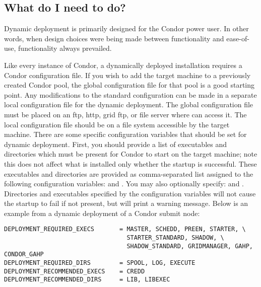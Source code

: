 \subsection{What do I need to do?}

Dynamic deployment is primarily designed for the Condor power user.
In other words, when design choices were being made between
functionality and ease-of-use, functionality always prevailed.

Like every instance of Condor, a dynamically deployed installation
requires a Condor configuration file.  If you wish to add the target
machine to a previously created Condor pool, the global configuration
file for that pool is a good starting point.  Any modifications to the
standard configuration can be made in a separate local configuration
file for the dynamic deployment.  The global configuration file must
be placed on an ftp, http, grid ftp, or file server where
 can access it.  The local configuration file
should be on a file system accessible by the target machine.  There
are some specific configuration variables that should be set for
dynamic deployment.  First, you should provide a list of executables
and directories which must be present for Condor to start on the
target machine; note this does not affect what is installed only
whether the startup is successful.  These executables and directories
are provided as comma-separated list assigned to the following
configuration variables:  and
.  You may also optionally specify:
 and
.  Directories and executables
specified by the  configuration variables will
not cause the startup to fail if not present, but will print a warning
message.  Below is an example from a dynamic deployment of a Condor
submit node:

\footnotesize
\begin{verbatim}
DEPLOYMENT_REQUIRED_EXECS       = MASTER, SCHEDD, PREEN, STARTER, \
                                  STARTER_STANDARD, SHADOW, \
                                  SHADOW_STANDARD, GRIDMANAGER, GAHP, CONDOR_GAHP
DEPLOYMENT_REQUIRED_DIRS        = SPOOL, LOG, EXECUTE
DEPLOYMENT_RECOMMENDED_EXECS    = CREDD
DEPLOYMENT_RECOMMENDED_DIRS     = LIB, LIBEXEC
\end{verbatim}
\normalsize

